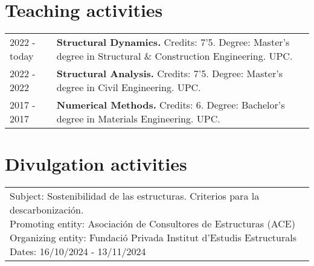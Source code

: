 \documentclass[12pt]{article}
\begin{document}
\section{Teaching activities}
\begin{tabularx}{\linewidth}{lX}
    2022 - today &
    \textbf{Structural Dynamics.} Credits: 7'5. Degree: Master's degree in Structural \& Construction Engineering. UPC. \\

    2022 - 2022 &
    \textbf{Structural Analysis.} Credits: 7'5. Degree: Master's degree in Civil Engineering. UPC. \\

    2017 - 2017 &
    \textbf{Numerical Methods.} Credits: 6. Degree: Bachelor's degree in Materials Engineering. UPC. \\
\end{tabularx}


\printbibliography[heading={bibintoc}, title={Participation in R+D+i projects}, type=project]


\section{Divulgation activities}
\begin{tabularx}{\linewidth}{l}
    \parbox{\linewidth}{
        Subject: Sostenibilidad de las estructuras. Criterios para la descarbonización. \\
        Promoting entity: Asociación de Consultores de Estructuras (ACE) \\
        Organizing entity: Fundació Privada Institut d'Estudis Estructurals \\
        Dates: 16/10/2024 - 13/11/2024
    }
\end{tabularx}
\end{document}
